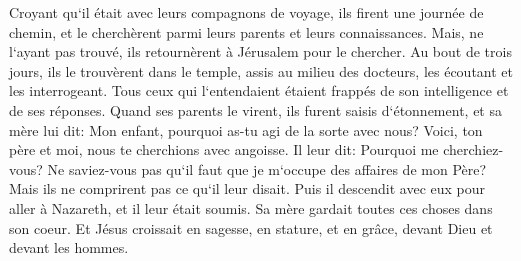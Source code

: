 \verse Croyant qu`il était avec leurs compagnons de voyage, ils firent une journée de chemin, et le cherchèrent parmi leurs parents et leurs connaissances. 
\verse Mais, ne l`ayant pas trouvé, ils retournèrent à Jérusalem pour le chercher. 
\verse Au bout de trois jours, ils le trouvèrent dans le temple, assis au milieu des docteurs, les écoutant et les interrogeant. 
\verse Tous ceux qui l`entendaient étaient frappés de son intelligence et de ses réponses. 
\verse Quand ses parents le virent, ils furent saisis d`étonnement, et sa mère lui dit: Mon enfant, pourquoi as-tu agi de la sorte avec nous? Voici, ton père et moi, nous te cherchions avec angoisse. 
\verse Il leur dit: Pourquoi me cherchiez-vous? Ne saviez-vous pas qu`il faut que je m`occupe des affaires de mon Père? 
\verse Mais ils ne comprirent pas ce qu`il leur disait. 
\verse Puis il descendit avec eux pour aller à Nazareth, et il leur était soumis. Sa mère gardait toutes ces choses dans son coeur. 
\verse Et Jésus croissait en sagesse, en stature, et en grâce, devant Dieu et devant les hommes. 


